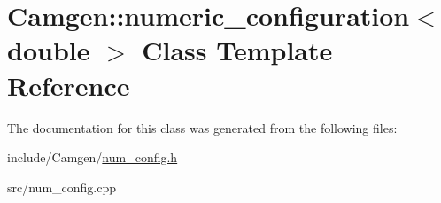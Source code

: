 \hypertarget{a00387}{}\section{Camgen\+:\+:numeric\+\_\+configuration$<$ double $>$ Class Template Reference}
\label{a00387}


The documentation for this class was generated from the following files\+:\begin{DoxyCompactItemize}
\item 
include/\+Camgen/\hyperlink{a00702}{num\+\_\+config.\+h}\item 
src/num\+\_\+config.\+cpp\end{DoxyCompactItemize}
